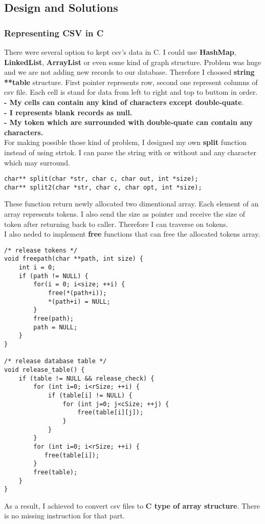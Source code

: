 \documentclass{article}
\begin{document}
\subsection{Design and Solutions}
\subsubsection{Representing CSV in C}
There were several option to kept csv's data in C. I could use \textbf{HashMap}, \textbf{LinkedList}, \textbf{ArrayList} or even some kind of graph structure. Problem was huge and we are not adding new records to our database. Therefore I choosed \textbf{string **table} structure. First pointer represents row, second one represent columns of csv file. Each cell is stand for data from left to right and top to buttom in order.\\
\textbf{- My cells can contain any kind of characters except double-quate}.\\
\textbf{- I represents blank records as null.}\\
\textbf{- My token which are surrounded with double-quate can contain any characters.}\\
For making possible those kind of problem, I designed my own \textbf{split} function instead of using strtok. I can parse the string with or without and any character which may surround.
\begin{lstlisting}[style=CStyle]
char** split(char *str, char c, char out, int *size);
char** split2(char *str, char c, char opt, int *size);
\end{lstlisting}
These function return newly allocated two dimentional array. Each element of an  array represents tokens. I also send the size as pointer and receive the size of token after returning back to caller. Therefore I can traverse on tokens.\\
I also neded to implement \textbf{free} functions that can free the allocated tokens array.
\begin{lstlisting}[style=CStyle]
/* release tokens */
void freepath(char **path, int size) {
    int i = 0;
    if (path != NULL) {
        for(i = 0; i<size; ++i) {
            free(*(path+i));
            *(path+i) = NULL;
        }
        free(path);
        path = NULL;
    }
}

/* release database table */
void release_table() {
    if (table != NULL && release_check) {
        for (int i=0; i<rSize; ++i) {
            if (table[i] != NULL) {
                for (int j=0; j<cSize; ++j) {
                    free(table[i][j]);
                }
            }
        }
        for (int i=0; i<rSize; ++i) {
           free(table[i]);
        }
        free(table);
    }
}
\end{lstlisting}
As a result, I achieved to convert csv files to \textbf{C type of array structure}. There is no missing instruction for that part.
\end{document}
